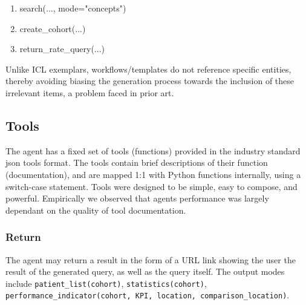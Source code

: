 \documentclass[11pt]{article}
\begin{document}
\begin{enumerate}
	\item search(..., mode="concepts")
	\item create\_cohort(...)
	\item return\_rate\_query(...)
\end{enumerate}
Unlike ICL exemplars, workflows/templates do not reference specific entities, thereby avoiding biasing the generation process towards the inclusion of these irrelevant items, a problem faced in prior art.


\subsection{Tools}
The agent has a fixed set of tools (functions) provided in the industry standard json tools format.
The tools contain brief descriptions of their function (documentation), and are mapped 1:1 with Python functions internally, using a switch-case statement.
Tools were designed to be simple, easy to compose, and powerful. Empirically we observed that agents performance was largely dependant on the quality of tool documentation.

\subsubsection{Return}
The agent may return a result in the form of a URL link showing the user the result of the generated query, as well as the query itself.
The output modes include \texttt{patient\_list(cohort)}, \texttt{statistics(cohort)}, \texttt{performance\_indicator(cohort, KPI, location, comparison\_location)}.
\end{document}
